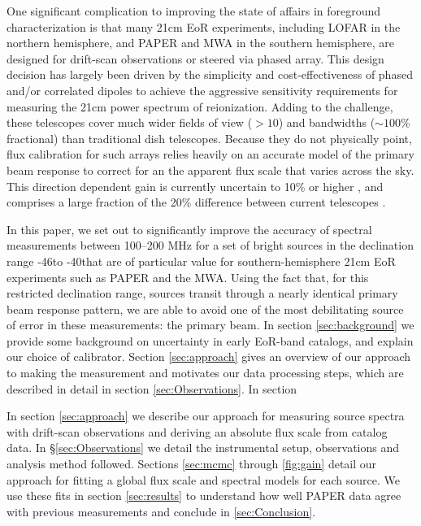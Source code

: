 \documentclass[preprint]{aastex}
\begin{document}
One significant complication to improving the state of affairs in foreground characterization
is that many 21cm EoR experiments, including LOFAR in the northern hemisphere, and
PAPER and MWA in the southern hemisphere, are designed for drift-scan observations or steered via phased array.
This design decision has largely been driven by the simplicity and cost-effectiveness of
phased and/or correlated dipoles to achieve the aggressive sensitivity requirements
for measuring the 21cm power spectrum of reionization.
Adding to the challenge, these telescopes 
cover much wider fields of view ($>10$\arcdeg) and bandwidths
($\sim 100$\% fractional) than traditional dish telescopes.
Because they do not physically point, flux calibration for such arrays relies heavily
on an accurate model of the primary beam response to correct for an
the apparent flux scale that varies across the sky.
This direction dependent gain is currently uncertain to 10\% or higher
\citep{Pober:2012p8800}, and comprises a large fraction of the 20\% difference between current telescopes \citep{Jacobs:2013p9713}.

In this paper, we set out to significantly improve the accuracy of spectral measurements between 
100--200 MHz for a set of bright sources in the declination range -46\arcdeg to -40\arcdeg that
are of particular value for southern-hemisphere 21cm EoR experiments such as PAPER and the MWA.
Using the fact that, for this restricted declination range,
sources transit through a nearly identical primary beam response pattern, we are able to avoid one of the
most debilitating source of error in these measurements: the primary beam.  
In section \ref{sec:background} we provide some background on uncertainty in early EoR-band catalogs,
and explain our choice of calibrator. Section \ref{sec:approach} gives an overview 
of our approach to making the measurement and motivates our data processing steps, which 
are described in detail in section \ref{sec:Observations}. In section 

In section \ref{sec:approach} we describe our approach for measuring source spectra with
drift-scan observations and deriving an absolute flux scale from catalog data.  
In \S\ref{sec:Observations} we detail the instrumental 
setup, observations and analysis method followed. Sections \ref{sec:mcmc} through
\ref{fig:gain} detail our approach for fitting a global flux scale and spectral models for each source.
We use these fits in section \ref{sec:results} to understand how well PAPER data agree
with previous measurements and conclude in \ref{sec:Conclusion}.
\end{document}
